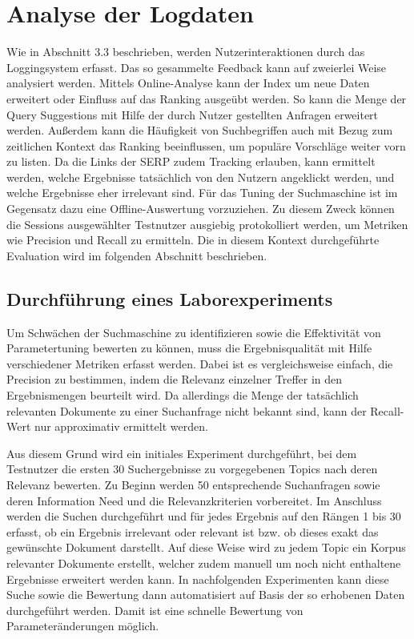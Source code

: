 \section{Analyse der Logdaten}
\label{chap:log_analysis}

Wie in Abschnitt 3.3 beschrieben, werden Nutzerinteraktionen durch das Loggingsystem erfasst. Das so gesammelte Feedback kann auf zweierlei Weise analysiert werden. Mittels Online-Analyse kann der Index um neue Daten erweitert oder Einfluss auf das Ranking ausgeübt werden. So kann die Menge der Query Suggestions mit Hilfe der durch Nutzer gestellten Anfragen erweitert werden. Außerdem kann die Häufigkeit von Suchbegriffen auch mit Bezug zum zeitlichen Kontext das Ranking beeinflussen, um populäre Vorschläge weiter vorn zu listen. Da die Links der SERP zudem Tracking erlauben, kann ermittelt werden, welche Ergebnisse tatsächlich von den Nutzern angeklickt werden, und welche Ergebnisse eher irrelevant sind.
Für das Tuning der Suchmaschine ist im Gegensatz dazu eine Offline-Auswertung vorzuziehen. Zu diesem Zweck können die Sessions ausgewählter Testnutzer ausgiebig protokolliert werden, um Metriken wie Precision und Recall zu ermitteln. Die in diesem Kontext durchgeführte Evaluation wird im folgenden Abschnitt beschrieben.

\subsection{Durchführung eines Laborexperiments}
\label{chap:labroratory_experiment}

Um Schwächen der Suchmaschine zu identifizieren sowie die Effektivität von Parametertuning bewerten zu können, muss die Ergebnisqualität mit Hilfe verschiedener Metriken erfasst werden. Dabei ist es vergleichsweise einfach, die Precision zu bestimmen, indem die Relevanz einzelner Treffer in den Ergebnismengen beurteilt wird. Da allerdings die Menge der tatsächlich relevanten Dokumente zu einer Suchanfrage nicht bekannt sind, kann der Recall-Wert nur approximativ ermittelt werden.

Aus diesem Grund wird ein initiales Experiment durchgeführt, bei dem Testnutzer die ersten 30 Suchergebnisse zu vorgegebenen Topics nach deren Relevanz bewerten. Zu Beginn werden 50 entsprechende Suchanfragen sowie deren Information Need und die Relevanzkriterien vorbereitet. Im Anschluss werden die Suchen durchgeführt und für jedes Ergebnis auf den Rängen 1 bis 30 erfasst, ob ein Ergebnis irrelevant oder relevant ist bzw. ob dieses exakt das gewünschte Dokument darstellt. Auf diese Weise wird zu jedem Topic ein Korpus relevanter Dokumente erstellt, welcher zudem manuell um noch nicht enthaltene Ergebnisse erweitert werden kann. In nachfolgenden Experimenten kann diese Suche sowie die Bewertung dann automatisiert auf Basis der so erhobenen Daten durchgeführt werden. Damit ist eine schnelle Bewertung von Parameteränderungen möglich.

